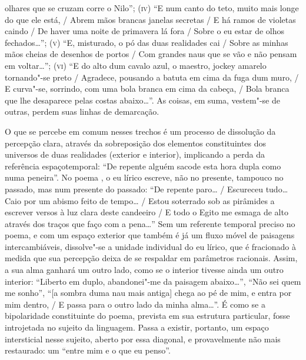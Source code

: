 olhares que se cruzam corre o Nilo''; (\textsc{iv}) ``E num canto do
teto, muito mais longe do que ele está, / Abrem mãos brancas janelas
secretas / E há ramos de violetas caindo / De haver uma noite de
primavera lá fora / Sobre o eu estar de olhos fechados\ldots{}'';
(\textsc{v}) ``E, misturado, o pó das duas realidades cai / Sobre as
minhas mãos cheias de desenhos de portos / Com grandes naus que se vão e
não pensam em voltar\ldots{}''; (\textsc{vi}) ``E do alto dum cavalo azul, o
maestro, jockey amarelo tornando"-se preto / Agradece, pousando a batuta
em cima da fuga dum muro, / E curva"-se, sorrindo, com uma bola branca em
cima da cabeça, / Bola branca que lhe desaparece pelas costas
abaixo\ldots{}''. As coisas, em suma, vestem"-se de outras, perdem suas linhas
de demarcação.

O que se percebe em comum nesses trechos é um processo de dissolução da
percepção clara, através da sobreposição dos elementos constituintes dos
universos de duas realidades (exterior e interior), implicando a perda
da referência espaçotemporal: ``De repente alguém sacode esta hora dupla
como numa peneira''. No poema , o eu lírico escreve, não no presente,
tampouco no passado, mas num presente do passado: ``De repente paro\ldots{} /
Escureceu tudo\ldots{} Caio por um abismo feito de tempo\ldots{} / Estou soterrado
sob as pirâmides a escrever versos à luz clara deste candeeiro / E todo
o Egito me esmaga de alto através dos traços que faço com a pena\ldots{}''
Sem um referente temporal preciso no poema, e com um espaço exterior que
também é já um fluxo móvel de paisagens intercambiáveis, dissolve"-se a
unidade individual do eu lírico, que é fracionado à medida que sua
percepção deixa de se respaldar em parâmetros racionais. Assim, a sua
alma ganhará um outro lado, como se o interior tivesse ainda um outro
interior: ``Liberto em duplo, abandonei"-me da paisagem abaixo\ldots{}'',
``Não sei quem me sonho'', ``{[}a sombra duma nau mais antiga{]} chega
ao pé de mim, e entra por mim dentro, / E passa para o outro lado da
minha alma\ldots{}''. É como se a bipolaridade constituinte do poema,
prevista em sua estrutura particular, fosse introjetada no sujeito da
linguagem. Passa a existir, portanto, um espaço intersticial nesse
sujeito, aberto por essa diagonal, e provavelmente não mais restaurado:
um ``entre mim e o que eu penso''.


